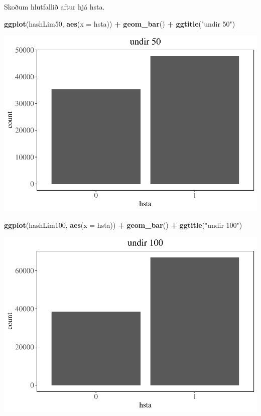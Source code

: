 \documentclass[
]{article}
\newenvironment{Shaded}{\begin{snugshade}}{\end{snugshade}}
\newcommand{\DataTypeTok}[1]{\textcolor[rgb]{0.13,0.29,0.53}{#1}}
\newcommand{\KeywordTok}[1]{\textcolor[rgb]{0.13,0.29,0.53}{\textbf{#1}}}
\newcommand{\NormalTok}[1]{#1}
\newcommand{\OperatorTok}[1]{\textcolor[rgb]{0.81,0.36,0.00}{\textbf{#1}}}
\newcommand{\StringTok}[1]{\textcolor[rgb]{0.31,0.60,0.02}{#1}}
\begin{document}
Skoðum hlutfallið aftur hjá hsta.

\begin{Shaded}
\begin{Highlighting}[]
\KeywordTok{ggplot}\NormalTok{(hashLim50, }\KeywordTok{aes}\NormalTok{(}\DataTypeTok{x =}\NormalTok{ hsta)) }\OperatorTok{+}
\StringTok{  }\KeywordTok{geom_bar}\NormalTok{() }\OperatorTok{+}\StringTok{ }
\StringTok{  }\KeywordTok{ggtitle}\NormalTok{(}\StringTok{"undir 50"}\NormalTok{)}
\end{Highlighting}
\end{Shaded}

\includegraphics{Simplify_files/figure-latex/unnamed-chunk-3-1.pdf}

\begin{Shaded}
\begin{Highlighting}[]
\KeywordTok{ggplot}\NormalTok{(hashLim100, }\KeywordTok{aes}\NormalTok{(}\DataTypeTok{x =}\NormalTok{ hsta)) }\OperatorTok{+}
\StringTok{  }\KeywordTok{geom_bar}\NormalTok{() }\OperatorTok{+}\StringTok{ }
\StringTok{  }\KeywordTok{ggtitle}\NormalTok{(}\StringTok{"undir 100"}\NormalTok{)}
\end{Highlighting}
\end{Shaded}

\includegraphics{Simplify_files/figure-latex/unnamed-chunk-3-2.pdf}
\end{document}
